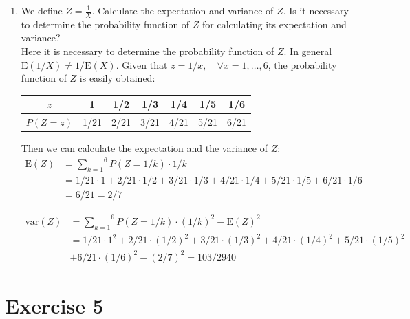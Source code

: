 \documentclass[12pt,thmsa]{article}
\begin{document}
\begin{enumerate}
\item We define $Z = \frac{1}{X}$. Calculate the expectation and variance of $Z$. Is it necessary to determine the probability function of $Z$ for calculating its expectation and variance?\\

Here it is necessary to determine the probability function of $ Z $. In general $\mbox{E}(1/X) \neq 1/\mbox{E}(X)$. Given that $z=1/x, \quad \forall x=1,\ldots,6$, the probability function of $ Z $ is easily obtained:

			\begin{center}
			\begin{tabular}{|c|c|c|c|c|c|c|}
			\hline
			$z$ & 1 & 1/2 & 1/3 & 1/4 & 1/5 & 1/6 \\
			\hline
			$P(Z=z)$ & 1/21 & 2/21 & 3/21 & 4/21 & 5/21 & 6/21\\
			\hline
			\end{tabular}
			\end{center}

Then we can calculate the expectation and the variance of $ Z $:
\begin{equation*}
\begin{split}
\mbox{E}(Z) & = \overset{6}{\underset{k=1}{\sum}}P(Z=1/k)\cdot 1/k \\
& = 1/21\cdot1 + 2/21\cdot 1/2 + 3/21\cdot 1/3+4/21 \cdot 1/4 +5/21 \cdot 1/5+6/21 \cdot 1/6 \\&= 6/21 =2/7
\end{split}
\end{equation*}

\begin{equation*}
\begin{split}
\mbox{var}(Z) & = \overset{6}{\underset{k=1}{\sum}}P(Z=1/k)\cdot (1/k)^2 -\mbox{E}(Z)^2  \\
& = 1/21\cdot 1^2 + 2/21\cdot (1/2)^2 + 3/21\cdot (1/3)^2+4/21 \cdot (1/4)^2 +5/21 \cdot (1/5)^2\\&+6/21 \cdot (1/6)^2 -(2/7)^2  = 103/2940
\end{split}
\end{equation*}
\end{enumerate}


\section*{Exercise 5} %
\end{document}
